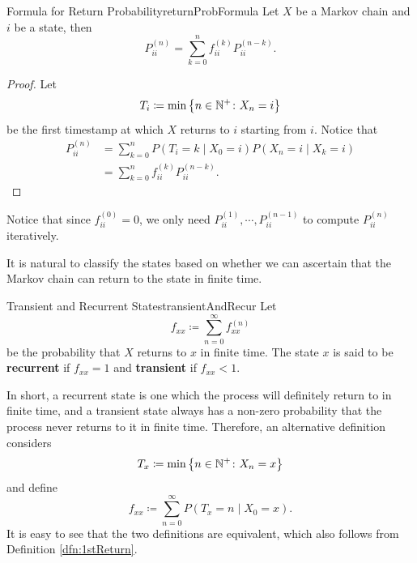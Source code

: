 \documentclass[math, code]{amznotes}
\theoremstyle{remark}
\begin{document}
\begin{thmbox}{Formula for Return Probability}{returnProbFormula}
    Let $X$ be a Markov chain and $i$ be a state, then 
    \begin{equation*}
        P_{ii}^{\left(n\right)} = \sum_{k = 0}^{n}f_{ii}^{\left(k\right)}P_{ii}^{\left(n - k\right)}.
    \end{equation*}
    \tcblower
    \begin{proof}
        Let 
        \begin{equation*}
            T_i \coloneqq \min\left\{n \in \mathbb{N}^+ \colon X_n = i\right\}
        \end{equation*}
        be the first timestamp at which $X$ returns to $i$ starting from $i$. Notice that 
        \begin{align*}
            P_{ii}^{\left(n\right)} & = \sum_{k = 0}^{n}P\left(T_i = k \mid X_0 = i\right)P\left(X_n = i \mid X_k = i\right) \\
            & = \sum_{k = 0}^{n}f_{ii}^{\left(k\right)}P_{ii}^{\left(n - k\right)}.
        \end{align*}
    \end{proof}
\end{thmbox}
Notice that since $f_{ii}^{\left(0\right)} = 0$, we only need $P_{ii}^{\left(1\right)}, \cdots, P_{ii}^{\left(n - 1\right)}$ to compute $P_{ii}^{\left(n\right)}$ iteratively.

It is natural to classify the states based on whether we can ascertain that the Markov chain can return to the state in finite time.
\begin{dfnbox}{Transient and Recurrent States}{transientAndRecur}
    Let 
    \begin{equation*}
        f_{xx} \coloneqq \sum_{n = 0}^{\infty}f^{\left(n\right)}_{xx}
    \end{equation*}
    be the probability that $X$ returns to $x$ in finite time. The state $x$ is said to be {\color{red} \textbf{recurrent}} if $f_{xx} = 1$ and {\color{red} \textbf{transient}} if $f_{xx} < 1$.
\end{dfnbox}
In short, a recurrent state is one which the process will definitely return to in finite time, and a transient state always has a non-zero probability that the process never returns to it in finite time. Therefore, an alternative definition considers 
\begin{equation*}
    T_x \coloneqq \min\left\{n \in \mathbb{N}^+ \colon X_n = x\right\}
\end{equation*}
and define
\begin{equation*}
    f_{xx} \coloneqq \sum_{n = 0}^{\infty}P\left(T_x = n \mid X_0 = x\right).
\end{equation*}
It is easy to see that the two definitions are equivalent, which also follows from Definition \ref{dfn:1stReturn}.
\end{document}
